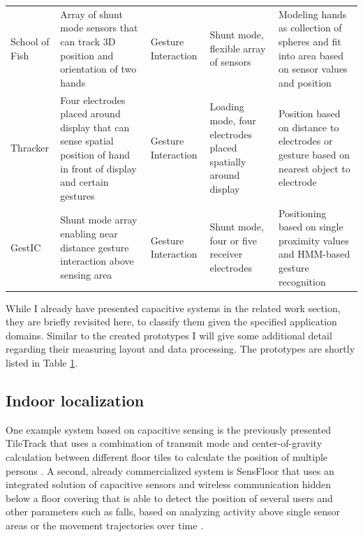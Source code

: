 \begin{table}[htbp]
\begin{tabularx}{\linewidth}{Xp{3.5cm}Xp{3.5cm}p{3.5cm}}
    School of Fish \cite{smith1999thesis} & Array of shunt mode sensors that can track 3D position and orientation of two hands  & Gesture Interaction & Shunt mode, flexible array of sensors & Modeling hands as collection of spheres and fit into area based on sensor values and position \\
    Thracker \cite{Wimmer2006} & Four electrodes placed around display that can sense spatial position of hand in front of display and certain gestures & Gesture Interaction & Loading mode, four electrodes placed spatially around display & Position based on distance to electrodes or gesture based on nearest object to electrode \\
    GestIC \cite{microchip2013} & Shunt mode array enabling near distance gesture interaction above sensing area & Gesture Interaction & Shunt mode, four or five receiver electrodes & Positioning based on single proximity values and HMM-based gesture recognition \\
    \bottomrule
    \end{tabularx}%
  \label{tab:related_cap_proto}%
\end{table}%

While I already have presented capacitive systems in the related work section, they are briefly revisited here, to classify them given the specified application domains. Similar to the created prototypes I will give some additional detail regarding their measuring layout and data processing. The prototypes are shortly listed in Table \ref{tab:related_cap_proto}.

\subsection{Indoor localization}
One example system based on capacitive sensing is the previously presented TileTrack that uses a combination of transmit mode and center-of-gravity calculation between different floor tiles to calculate the position of multiple persons \cite{Valtonen2009a}. A second, already commercialized system is SensFloor that uses an integrated solution of capacitive sensors and wireless communication hidden below a floor covering that is able to detect the position of several users and other parameters such as falls, based on analyzing activity above single sensor areas or the movement trajectories over time \cite{lauterbach2009}.
